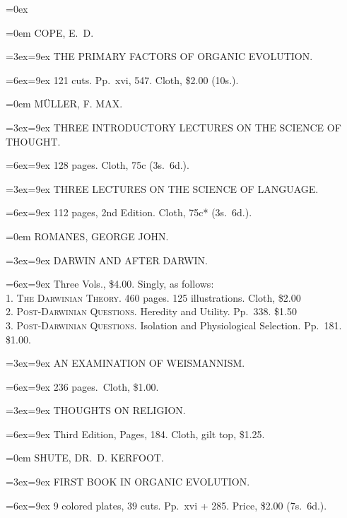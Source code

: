 \documentclass[oneside]{book}
\begin{document}
{\parskip=0ex\raggedright

\parindent=0em \normalsize
COPE, E.~D.
\nopagebreak

\parindent=3ex\hangindent=9ex \small
THE PRIMARY FACTORS OF ORGANIC EVOLUTION.
\nopagebreak

\parindent=6ex\hangindent=9ex \footnotesize
121 cuts. Pp.~xvi, 547. Cloth, \$2.00 (10s.).
\smallskip

\parindent=0em \normalsize
MÜLLER, F. MAX.
\nopagebreak

\parindent=3ex\hangindent=9ex\small
THREE INTRODUCTORY LECTURES ON THE SCIENCE OF THOUGHT.
\nopagebreak

\parindent=6ex\hangindent=9ex\footnotesize
128 pages. Cloth, 75c (3s.~6d.).
\smallskip

\parindent=3ex\hangindent=9ex\small
THREE LECTURES ON THE SCIENCE OF LANGUAGE.
\nopagebreak

\parindent=6ex\hangindent=9ex\footnotesize
112 pages, 2nd Edition. Cloth, 75c* (3s.~6d.).
\smallskip

\parindent=0em \normalsize
ROMANES, GEORGE JOHN.
\nopagebreak

\parindent=3ex\hangindent=9ex\small
DARWIN AND AFTER DARWIN.
\nopagebreak

\parindent=6ex\hangindent=9ex \footnotesize
Three Vols., \$4.00. Singly, as follows:
\\
1. \textsc{The Darwinian Theory}. 460 pages. 125 illustrations. Cloth, \$2.00
\\
2. \textsc{Post-Darwinian Questions}. Heredity and Utility. Pp.~338. \$1.50
\\
3. \textsc{Post-Darwinian Questions}. Isolation and Physiological Selection.
Pp.~181. \$1.00.
\smallskip

\parindent=3ex\hangindent=9ex \small
AN EXAMINATION OF WEISMANNISM.
\nopagebreak

\parindent=6ex\hangindent=9ex \footnotesize
236 pages.~Cloth, \$1.00.
\smallskip

\parindent=3ex\hangindent=9ex \small
THOUGHTS ON RELIGION.
\nopagebreak

\parindent=6ex\hangindent=9ex\footnotesize
Third Edition, Pages, 184. Cloth, gilt top, \$1.25.
\smallskip

\parindent=0em \normalsize
SHUTE, DR.\ D. KERFOOT.
\nopagebreak

\parindent=3ex\hangindent=9ex \small
FIRST BOOK IN ORGANIC EVOLUTION.
\nopagebreak

\parindent=6ex\hangindent=9ex\footnotesize
9 colored plates, 39 cuts. Pp.~xvi + 285. Price, \$2.00 (7s.~6d.).
\smallskip

}
\end{document}
